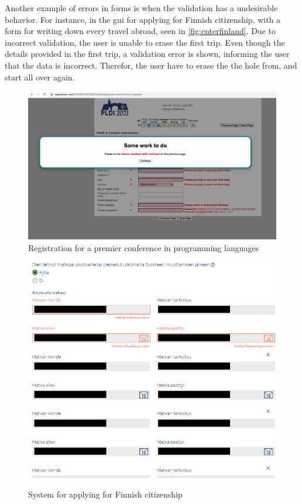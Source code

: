Another example of errors in forms is when the validation has a undesirable behavior. For instance, in the \gls{gui} for applying for Finnish citizenship, with a form for writing down every travel abroad, seen in \autoref{fig:enterfinland}. Due to incorrect validation, the user is unable to erase the first trip. Even though the details provided in the first trip, a validation error is shown, informing the user that the data is incorrect. Therefor, the user have to erase the the hole from, and start all over again.
\begin{figure}
    \centering
    \includegraphics[scale=0.2, frame]{figures/PLDI.jpg}
    \caption{Registration for a premier conference in programming languages}
    \label{fig:PLDI}
\end{figure}


\begin{figure}
    \caption{System for applying for Finnish citizenship}
    \centering
    \includegraphics[scale=0.35, frame]{figures/enterfinland-ui-citizenship-cant-remove-first-trip.png}
    \label{fig:enterfinland}
\end{figure}

